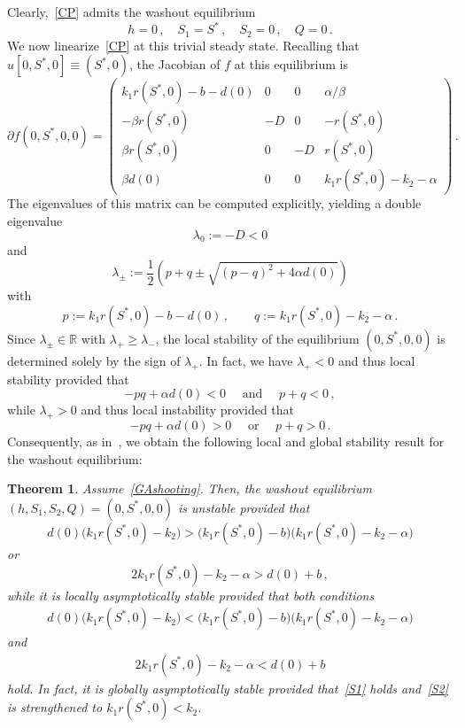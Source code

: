 \documentclass[reqno,11pt]{amsart}
\newtheorem{thm}{Theorem}[section]
\numberwithin{equation}{section}
\newcommand{\R}{\mathbb{R}}
\begin{document}
 
Clearly,~\eqref{CP} admits the washout equilibrium
$$
h=0\,,\quad S_1=S^*\,,\quad S_2=0\,,\quad  Q=0\,.
$$
We now linearize~\eqref{CP} at this trivial steady state.
Recalling that $u[0,S^*,0]\equiv (S^*,0)$, the Jacobian of $f$ at this equilibrium is
\begin{equation}\label{Jac}
\partial f(0,S^*,0,0)=\left(\begin{matrix}
k_1 r(S^*,0)-b-d(0) & 0 & 0 & \alpha/\beta\\[4pt]
-\beta r(S^*,0) & -D & 0& -r(S^*,0)\\[4pt]
\beta r(S^*,0) & 0 & -D& r(S^*,0)\\[4pt]
\beta d(0) & 0 & 0& k_1r(S^*,0)-k_2-\alpha
\end{matrix}\right)\,.
\end{equation}
The eigenvalues of this matrix can be computed explicitly, yielding a double eigenvalue
$$
\lambda_0:=-D<0
$$
and
\begin{equation}\label{lambda}
\lambda_\pm:=\frac{1}{2}\left(p+q \pm\sqrt{ (p-q)^2+4\alpha d(0)}\right)
\end{equation}
with 
$$
p:=k_1r(S^*,0)-b-d(0) \,,\qquad q:=k_1r(S^*,0)-k_2-\alpha\,.
$$
Since $\lambda_\pm\in\R$ with $\lambda_+\geq \lambda_-$, the local stability of the equilibrium $(0,S^*,0,0)$ is determined solely by the sign of $\lambda_+$.  
In fact, we have $\lambda_+<0$
and thus local stability provided that
\begin{equation}\label{stab}
-pq+\alpha d(0)< 0 \quad \text{ and }\quad p+q<0\,,
\end{equation}
while
$\lambda_+ >0$
and thus local instability provided that
\begin{equation}\label{instab}
-pq+\alpha d(0)>0 \quad \text{ or }\quad p+q>0\,.
\end{equation}
Consequently, as in~\cite{GHE21}, we obtain the following local and global stability result for the washout equilibrium:

\begin{thm}\label{P2}
Assume~\eqref{GAshooting}. Then, the  washout equilibrium $(h,S_1,S_2,Q)=(0,S^*,0,0)$ is unstable provided that
$$
d(0)\big( k_1r(S^*,0)-k_2\big) > \big(k_1r(S^*,0)-b\big)\big(k_1r(S^*,0)-k_2-\alpha\big)
$$
or
$$ 
2 k_1r(S^*,0)-k_2-\alpha > d(0)+b \,,
$$
while it is locally asymptotically stable  provided that both conditions
\begin{align}\label{S1}
d(0)\big( k_1r(S^*,0)-k_2\big)<\big(k_1r(S^*,0)-b\big)\big(k_1r(S^*,0)-k_2-\alpha\big) 
\end{align}
and
\begin{align}\label{S2}
2 k_1r(S^*,0)-k_2-\alpha<d(0)+b  
\end{align}
hold. In fact,  it is globally asymptotically stable  provided that~\eqref{S1} holds and~\eqref{S2} is strengthened to $k_1r(S^*,0)<k_2$.
\end{thm}
\end{document}
